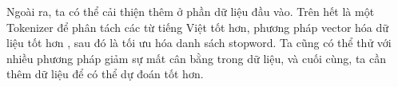 Ngoài ra, ta có thể cải thiện thêm ở phần dữ liệu đầu vào. Trên hết là một Tokenizer để phân tách các từ tiếng Việt tốt hơn, phương pháp vector hóa dữ liệu tốt hơn \cite{Doan_2022}, sau đó là tối ưu hóa danh sách stopword. Ta cũng có thể thử với nhiều phương pháp giảm sự mất cân bằng trong dữ liệu, và cuối cùng, ta cần thêm dữ liệu để có thể dự đoán tốt hơn.